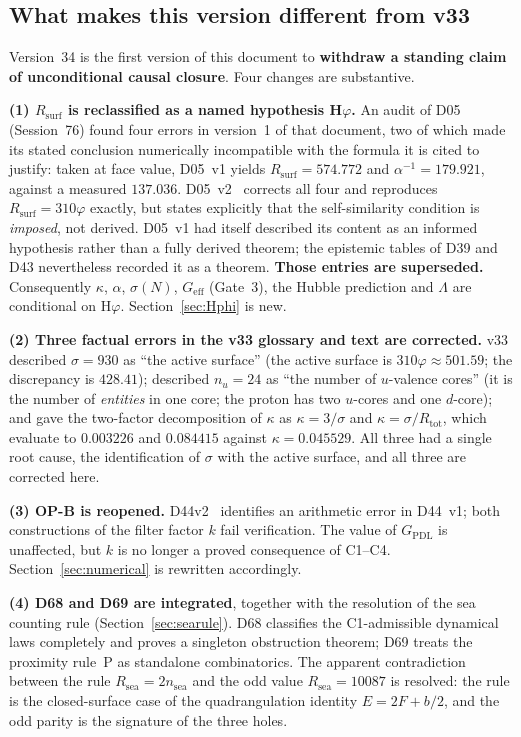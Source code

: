 \documentclass[11pt,a4paper]{article}
\newcommand{\Rsea}{R_{\mathrm{sea}}}
\theoremstyle{plain}
\theoremstyle{definition}
\theoremstyle{remark}
\newcommand{\Geff}{G_{\mathrm{eff}}}
\newcommand{\Rsurf}{R_{\mathrm{surf}}}
\newcommand{\Rtot}{R_{\mathrm{tot}}}
\newcommand{\sigmaN}{\sigma(N)}
\begin{document}
\subsection{What makes this version different from v33}
\label{subsec:diffv33}
Version~34 is the first version of this document to \textbf{withdraw a standing claim of unconditional causal closure}. Four changes are substantive.

\textbf{(1) $\Rsurf$ is reclassified as a named hypothesis H$\varphi$.} An audit of D05 (Session~76) found four errors in version~1 of that document, two of which made its stated conclusion numerically incompatible with the formula it is cited to justify: taken at face value, D05~v1 yields $\Rsurf=574.772$ and $\alpha^{-1}=179.921$, against a measured $137.036$. D05~v2~\cite{D05} corrects all four and reproduces $\Rsurf=310\varphi$ exactly, but states explicitly that the self-similarity condition is \emph{imposed}, not derived. D05~v1 had itself described its content as an informed hypothesis rather than a fully derived theorem; the epistemic tables of D39 and D43 nevertheless recorded it as a theorem. \textbf{Those entries are superseded.} Consequently $\kappa$, $\alpha$, $\sigmaN$, $\Geff$ (Gate~3), the Hubble prediction and $\Lambda$ are conditional on H$\varphi$. Section~\ref{sec:Hphi} is new.

\textbf{(2) Three factual errors in the v33 glossary and text are corrected.} v33 described $\sigma=930$ as ``the active surface'' (the active surface is $310\varphi\approx501.59$; the discrepancy is $428.41$); described $n_u=24$ as ``the number of $u$-valence cores'' (it is the number of \emph{entities} in one core; the proton has two $u$-cores and one $d$-core); and gave the two-factor decomposition of $\kappa$ as $\kappa=3/\sigma$ and $\kappa=\sigma/\Rtot$, which evaluate to $0.003226$ and $0.084415$ against $\kappa=0.045529$. All three had a single root cause, the identification of $\sigma$ with the active surface, and all three are corrected here.

\textbf{(3) OP-B is reopened.} D44v2~\cite{D44v2} identifies an arithmetic error in D44~v1; both constructions of the filter factor $k$ fail verification. The value of $G_{\mathrm{PDL}}$ is unaffected, but $k$ is no longer a proved consequence of C1--C4. Section~\ref{sec:numerical} is rewritten accordingly.

\textbf{(4) D68 and D69 are integrated}, together with the resolution of the sea counting rule (Section~\ref{sec:searule}). D68 classifies the C1-admissible dynamical laws completely and proves a singleton obstruction theorem; D69 treats the proximity rule~P as standalone combinatorics. The apparent contradiction between the rule $\Rsea=2n_{\mathrm{sea}}$ and the odd value $\Rsea=10087$ is resolved: the rule is the closed-surface case of the quadrangulation identity $E=2F+b/2$, and the odd parity is the signature of the three holes.
\end{document}
